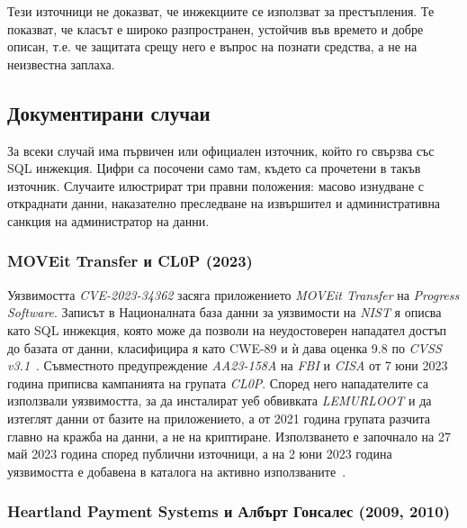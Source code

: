 Тези източници не доказват, че инжекциите се използват за престъпления. Те
показват, че класът е широко разпространен, устойчив във времето и добре описан,
т.е. че защитата срещу него е въпрос на познати средства, а не на неизвестна заплаха.

\subsection{Документирани случаи}
\label{sec:cybercrime-cases}

За всеки случай има първичен или официален източник, който го свързва със SQL
инжекция. Цифри са посочени само там, където са прочетени в такъв източник.
Случаите илюстрират три правни положения: масово изнудване с откраднати данни,
наказателно преследване на извършител и административна санкция на администратор
на данни.

\subsubsection{MOVEit Transfer и CL0P (2023)}

Уязвимостта \textit{CVE-2023-34362} засяга приложението \textit{MOVEit Transfer} на
\textit{Progress Software}. Записът в Националната база данни за уязвимости на
\textit{NIST} я описва като SQL инжекция, която може да позволи на неудостоверен
нападател достъп до базата от данни, класифицира я като CWE-89 и ѝ дава оценка 9.8
по \textit{CVSS v3.1}~\cite{nvd_cve_2023_34362}. Съвместното предупреждение
\textit{AA23-158A} на \textit{FBI} и \textit{CISA} от 7 юни 2023 година приписва кампанията на
групата \textit{CL0P}. Според него нападателите са използвали уязвимостта, за да
инсталират уеб обвивката \textit{LEMURLOOT} и да изтеглят данни от базите на
приложението, а от 2021 година групата разчита главно на кражба на данни, а не на
криптиране. Използването е започнало на 27 май 2023 година според публични
източници, а на 2 юни 2023 година уязвимостта е добавена в каталога на активно
използваните~\cite{cisa_aa23_158a}.

\subsubsection{Heartland Payment Systems и Албърт Гонсалес (2009, 2010)}

